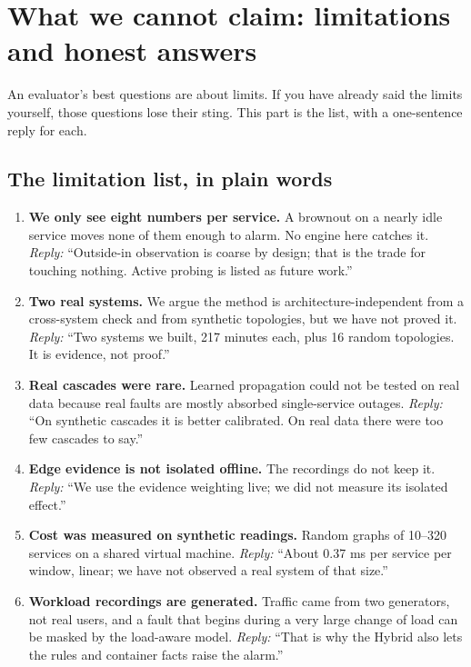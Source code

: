 \chapter{What we cannot claim: limitations and honest answers}
\label{ch:limits}

An evaluator's best questions are about limits. If you have already said the limits yourself, those questions lose their sting. This part is the list, with a one-sentence reply for each.

\section{The limitation list, in plain words}

\begin{enumerate}
\item \textbf{We only see eight numbers per service.} A brownout on a nearly idle service moves none of them enough to alarm. No engine here catches it. \emph{Reply:} ``Outside-in observation is coarse by design; that is the trade for touching nothing. Active probing is listed as future work.''

\item \textbf{Two real systems.} We argue the method is architecture-independent from a cross-system check and from synthetic topologies, but we have not proved it. \emph{Reply:} ``Two systems we built, 217 minutes each, plus 16 random topologies. It is evidence, not proof.''

\item \textbf{Real cascades were rare.} Learned propagation could not be tested on real data because real faults are mostly absorbed single-service outages. \emph{Reply:} ``On synthetic cascades it is better calibrated. On real data there were too few cascades to say.''

\item \textbf{Edge evidence is not isolated offline.} The recordings do not keep it. \emph{Reply:} ``We use the evidence weighting live; we did not measure its isolated effect.''

\item \textbf{Cost was measured on synthetic readings.} Random graphs of 10--320 services on a shared virtual machine. \emph{Reply:} ``About 0.37 ms per service per window, linear; we have not observed a real system of that size.''

\item \textbf{Workload recordings are generated.} Traffic came from two generators, not real users, and a fault that begins during a very large change of load can be masked by the load-aware model. \emph{Reply:} ``That is why the Hybrid also lets the rules and container facts raise the alarm.''


\end{enumerate}
